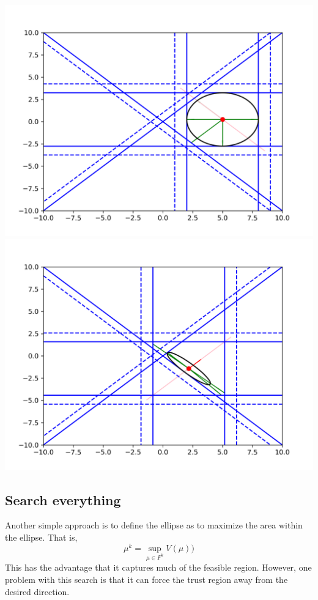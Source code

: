 \documentclass{article}
\begin{document}
\includegraphics[scale=0.4]{advantage_of_ellipse_1.png}
\includegraphics[scale=0.4]{advantage_of_ellipse_2.png}



\subsection{Search everything}
Another simple approach is to define the ellipse as to maximize the area within the ellipse.
That is,
$$\mu^k = \sup_{\mu \in F^k} V(\mu))$$
This has the advantage that it captures much of the feasible region.
However, one problem with this search is that it can force the trust region away from the desired direction.
\end{document}

